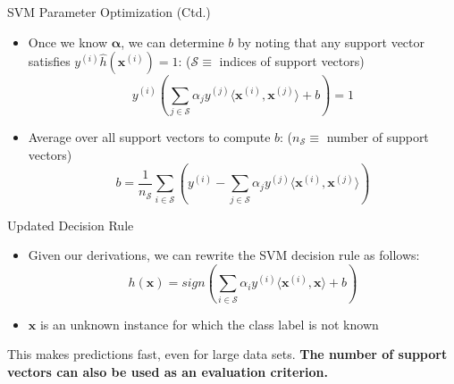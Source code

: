 \begin{frame}{SVM Parameter Optimization (Ctd.)}{}\optional
	\begin{itemize}
		\item Once we know $\bm{\alpha}$, we can determine $b$ by noting that any
			support vector satisfies $y^{(i)} \widehat{h}(\bm{x}^{(i)}) = 1$: {\scriptsize ($\mathcal{S} \equiv$ indices of support vectors)}
		\begin{equation}
			y^{(i)} \left( \sum_{j \in \mathcal{S}} \alpha_j y^{(j)} \langle \bm{x}^{(i)}, \bm{x}^{(j)} \rangle + b \right) = 1
		\end{equation}
		\item Average over all support vectors to compute $b$: {\scriptsize ($n_\mathcal{S} \equiv$ number of support vectors)}
		\begin{equation}
			b = \frac{1}{n_{\mathcal{S}}} \sum_{i \in \mathcal{S}} \left(
				y^{(i)} - \sum_{j \in \mathcal{S}} \alpha_j y^{(j)} \langle \bm{x}^{(i)}, \bm{x}^{(j)} \rangle
			\right)
		\end{equation}
	\end{itemize}
\end{frame}


\begin{frame}{Updated Decision Rule}{}
	\begin{itemize}
		\item Given our derivations, we can rewrite the SVM decision rule as follows:
		\begin{equation}
			h(\bm{x}) = sign\left( \sum_{i \in \mathcal{S}} \alpha_i y^{(i)} \langle \bm{x}^{(i)}, \bm{x} \rangle + b \right)
		\end{equation}
		\item $\bm{x}$ is an unknown instance for which the class label is not known
	\end{itemize}

	\begin{boxBlueNoFrame}
		\footnotesize
		 This makes predictions fast, even for large data sets.
		\textbf{The number of support vectors can also be used as an evaluation criterion.}
	\end{boxBlueNoFrame}
\end{frame}


